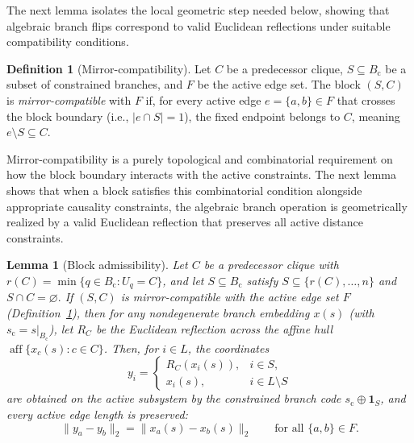 \documentclass[11pt]{article}
\theoremstyle{plain}
\newtheorem{lemma}{Lemma}
\theoremstyle{definition}
\newtheorem{definition}{Definition}
\begin{document}
The next lemma isolates the local geometric step needed below, showing that algebraic branch flips correspond to valid Euclidean reflections under suitable compatibility conditions.

\begin{definition}[Mirror-compatibility]
\label{def:mirror-compatible}
Let $C$ be a predecessor clique, $S \subseteq B_{\mathrm{c}}$ be a subset of constrained branches, and $F$ be the active edge set. The block $(S,C)$ is \emph{mirror-compatible} with $F$ if, for every active edge $e = \{a,b\} \in F$ that crosses the block boundary (i.e., $\lvert e \cap S \rvert = 1$), the fixed endpoint belongs to $C$, meaning $e \setminus S \subseteq C$.
\end{definition}

Mirror-compatibility is a purely topological and combinatorial requirement on how the block boundary interacts with the active constraints. The next lemma shows that when a block satisfies this combinatorial condition alongside appropriate causality constraints, the algebraic branch operation is geometrically realized by a valid Euclidean reflection that preserves all active distance constraints.

\begin{lemma}[Block admissibility]
\label{lem:block-admissibility}
Let $C$ be a predecessor clique with $r(C)=\min\{q\in B_{\mathrm{c}}: U_q=C\}$, and let $S\subseteq B_{\mathrm{c}}$ satisfy $S\subseteq \{r(C),\ldots,n\}$ and $S\cap C=\varnothing.$ If $(S,C)$ is mirror-compatible with the active edge set $F$ (Definition~\ref{def:mirror-compatible}), then for any nondegenerate branch embedding $x(s)$ (with $s_{\mathrm{c}}=s|_{B_{\mathrm{c}}}$), let $R_C$ be the Euclidean reflection across the affine hull $\operatorname{aff}\{x_c(s) : c \in C\}$. Then, for $i \in L$, the coordinates
\[
y_i =
\begin{cases}
R_C(x_i(s)), & i\in S,\\
x_i(s), & i\in L\setminus S
\end{cases}
\]
are obtained on the active subsystem by the constrained branch code $s_{\mathrm{c}}\oplus \mathbf{1}_S$, and every active edge length is preserved:
\[
\|y_a-y_b\|_2=\|x_a(s)-x_b(s)\|_2
\qquad
\text{for all } \{a,b\}\in F.
\]
\end{lemma}
\end{document}
